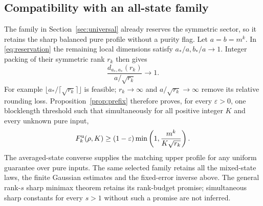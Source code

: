 \subsection{Compatibility with an all-state family}
The family in Section~\ref{sec:universal} already reserves the symmetric sector, so it retains the sharp balanced pure profile without a purity flag. Let $a=b=m^k$. In \eqref{eq:reservation} the remaining local dimensions satisfy $a_*/a,b_*/a\to1$. Integer packing of their symmetric rank $r_k$ then gives
\[
 \frac{d_{a_*,a_*}(r_k)}{a/\sqrt{r_k}}\longrightarrow1.
\]
For example $\lfloor a_*/\lceil\sqrt{r_k}\rceil\rfloor$ is feasible; $r_k\to\infty$ and $a/\sqrt{r_k}\to\infty$ remove its relative rounding loss. Proposition~\ref{prop:prefix} therefore proves, for every $\varepsilon>0$, one blocklength threshold such that simultaneously for all positive integer $K$ and every unknown pure input,
\[
 F_k^{\rm u}(\rho,K)\ge(1-\varepsilon)
 \min\left(1,\frac{m^k}{K\sqrt{r_k}}\right).
\]
The averaged-state converse supplies the matching upper profile for any uniform guarantee over pure inputs. The same selected family retains all the mixed-state laws, the finite Gaussian estimates and the fixed-error inverse above. The general rank-$s$ sharp minimax theorem retains its rank-budget promise; simultaneous sharp constants for every $s>1$ without such a promise are not inferred.

